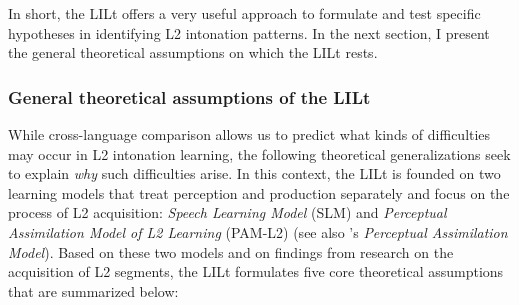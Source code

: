 In short, the LILt offers a very useful approach to formulate and test specific hypotheses in identifying L2 intonation patterns. In the next section, I present the general theoretical assumptions on which the LILt rests.


\subsubsection{General theoretical assumptions of the LILt}\label{sec:2.4.2.2}

While cross-language comparison allows us to predict what kinds of difficulties may occur in L2 intonation learning, the following theoretical generalizations seek to explain \textit{why} such difficulties arise. In this context, the LILt is founded on two learning models that treat perception and production separately and focus on the process of L2 acquisition:  \textit{Speech Learning Model} (SLM) and  \textit{Perceptual Assimilation Model of L2 Learning} (PAM-L2) (see also \citeauthor{Best1994}'s \citeyear{Best1994,Best1995} \textit{Perceptual Assimilation Model}). Based on these two models and on findings from research on the acquisition of L2 segments, the LILt formulates five core theoretical assumptions that are summarized below:\largerpage



